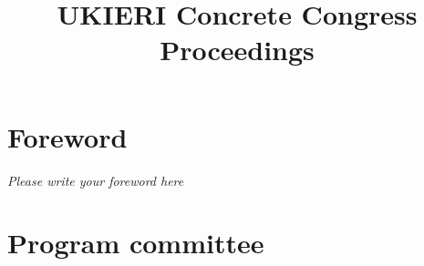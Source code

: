 \documentclass{report}
\begin{document}
\title{ \textbf{UKIERI Concrete Congress 
\linebreak
\vspace*{1cm}
 Proceedings}}
\author{}

\maketitle

\tableofcontents

\chapter*{Foreword}
\textit{Please write your foreword here}

\chapter*{Program committee}
\begin{multicols}{2}

\end{multicols}



\printindex[authors]
\end{document}
